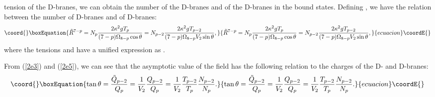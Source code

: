 \documentclass[a4paper,12pt]{article}
\begin{document}
tension of the D\coordHE{}-branes, we can obtain the number \coordHE{} of the D\coordHE{}-branes
and \coordHE{} of the D\coordHE{}-branes in the bound states. Defining
\coordHE{}, we have the relation
between the number \coordHE{} of D\coordHE{}-branes and \coordHE{} of D\coordHE{}-branes:
\begin{equation}\coord{}\boxEquation{
\tilde{R}^{7-p} = N_p\frac{2\kappa^2 gT_p}{(7-p)\Omega_{8-p}\cos\theta}
 =N_{p-2}\frac{2\kappa^2 gT_{p-2}}{(7-p)\Omega_{8-p}V_2\sin\theta},
}{
\tilde{R}^{7-p} = N_p\frac{2\kappa^2 gT_p}{(7-p)\Omega_{8-p}\cos\theta}
 =N_{p-2}\frac{2\kappa^2 gT_{p-2}}{(7-p)\Omega_{8-p}V_2\sin\theta},
}{ecuacion}\coordE{}\end{equation}
where the tensions \coordHE{} and \coordHE{} have a unified expression as
\coordHE{}.

{}From (\ref{2e3}) and (\ref{2e5}), we can see that the asymptotic
value \myHighlight{$\tan \theta $}\coordHE{} of the \coordHE{} field has the following relation to the
charges of the D\coordHE{}- and D\coordHE{}-branes:
\begin{equation}\coord{}\boxEquation{
\label{2e7}
\tan\theta =\frac{\tilde{Q}_{p-2}}{Q_p}=\frac{1}{V_2}\frac{Q_{p-2}}{Q_p}
=\frac{1}{V_2}\frac{T_{p-2}}{T_p}\frac{N_{p-2}}{N_p}.
}{
\tan\theta =\frac{\tilde{Q}_{p-2}}{Q_p}=\frac{1}{V_2}\frac{Q_{p-2}}{Q_p}
=\frac{1}{V_2}\frac{T_{p-2}}{T_p}\frac{N_{p-2}}{N_p}.
}{ecuacion}\coordE{}\end{equation}
\end{document}
